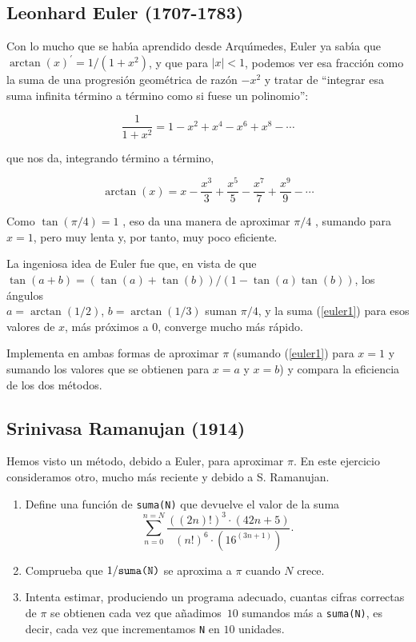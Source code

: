 



\subsection{Leonhard Euler (1707-1783)}

Con lo mucho que se hab\'{\i}a aprendido desde Arqu\'{\i}medes, Euler ya
sab\'{\i}a que
$\arctan(x)^{\prime} = 1/(1+x^2)$,
y que para $|x|<1$, podemos ver esa fracci\'on como la suma de una progresi\'on
geom\'etrica de raz\'on $-x^2$ 
y tratar de  ``integrar esa suma infinita t\'ermino a t\'ermino como si fuese un
polinomio'':

\[\frac{1}{1+x^2} = 1-x^2+x^4-x^6+x^8-\cdots\]

\noindent que nos da, integrando t\'ermino a t\'ermino, 

\begin{equation}\label{euler1}
\arctan(x) = x -\dfrac{x^3}{3} +\dfrac{x^5}{5}-\dfrac{x^7}{7}
+\dfrac{x^9}{9} -\cdots
\end{equation}

Como $\tan(\pi/4) = 1$ , eso da una manera de aproximar $\pi/4$ , sumando para
$x=1$, pero muy lenta y, por tanto, muy poco eficiente.

La ingeniosa idea de Euler fue que, en vista de que \quad 
$\tan(a+b) = (\tan(a)+\tan(b))/(1-\tan(a)\tan(b))$,
los \'angulos\\ $a=\arctan(1/2)$, $b=\arctan(1/3)$ suman $\pi/4$, y la suma
(\ref{euler1}) 
para esos valores de $x$, m\'as pr\'oximos a $0$,  converge mucho m\'as
r\'apido.
\
\smallskip
\

\begin{ejer}

Implementa en {\sage}   ambas formas de aproximar $\pi$ (sumando
(\ref{euler1}) para $x=1$ y sumando los valores que se obtienen para $x=a$ y
$x=b$) y compara la eficiencia de los dos m\'etodos.
\end{ejer}
\subsection{Srinivasa Ramanujan (1914)}
Hemos visto un m\'etodo, debido a Euler, para aproximar $\pi$. En este
ejercicio consideramos otro, mucho
m\'as reciente y debido a S. Ramanujan.
\begin{ejer}

\begin{enumerate}
\item Define una funci\'on de  {\sage}  {\tt suma(N)} que devuelve el valor de
la
suma
\[\sum_{n=0}^{n=N}\frac{((2n)!)^3\cdot (42n+5)}{(n!)^6\cdot (16^{(3n+1)})}.\]
\item Comprueba que $1/\text{\tt suma(N)}$ se aproxima a $\pi$ cuando $N$ crece.
\item Intenta estimar, produciendo un programa adecuado, cuantas cifras
correctas de $\pi$ se obtienen cada vez que a\~nadimos~$10$ sumandos m\'as a 
{\tt suma(N)}, es decir, cada vez que incrementamos {\tt N} en $10$ unidades.
\end{enumerate}
\end{ejer}
